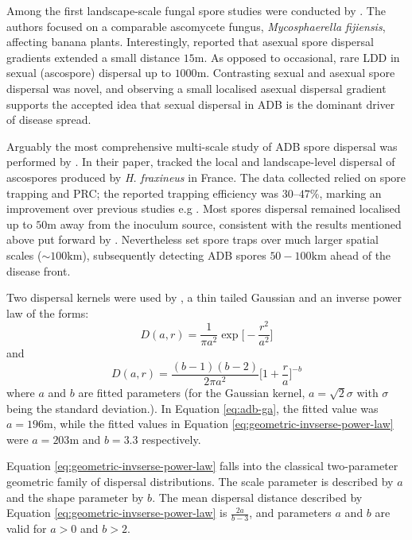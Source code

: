 Among the first landscape-scale fungal spore studies were conducted by \cite{long-range-dispersal}.
The authors focused on a comparable ascomycete fungus, \textit{Mycosphaerella fijiensis}, affecting banana plants.
Interestingly, \cite{long-range-dispersal} reported that asexual spore dispersal gradients extended 
a small distance $15\mathrm{m}$. As opposed to occasional, rare LDD in sexual (ascospore) dispersal up to $1000\mathrm{m}$.
Contrasting sexual and asexual spore dispersal was novel, and observing a small localised asexual dispersal gradient supports
the accepted idea that sexual dispersal in ADB is the dominant driver of disease spread.

Arguably the most comprehensive multi-scale study of ADB spore dispersal was performed by \cite{grosdidier2018tracking}.
In their paper, \cite{grosdidier2018tracking} tracked the local and landscape-level dispersal of ascospores
produced by \textit{H. fraxineus} in France.
The data collected relied on spore trapping and PRC; the reported trapping efficiency was $30–47\%$, marking an improvement over previous studies
e.g \cite{chandelier2014detection}. Most spores dispersal remained localised up to $50\mathrm{m}$ away from the inoculum source,
consistent with the results mentioned above put forward by \cite{chandelier2014detection}.
Nevertheless \cite{grosdidier2018tracking} set spore traps over much larger spatial scales ($\sim 100\mathrm{km}$),
subsequently detecting ADB spores $50-100\mathrm{km}$ ahead of the disease front.

Two dispersal kernels were used by \cite{grosdidier2018tracking}, a thin tailed Gaussian and an inverse 
power law of the forms:
\begin{equation}
    D(a, r) = \frac{1}{\pi a^2}\exp\big[-\frac{r^2}{a^2}\big]
    \label{eq:adb-ga}
\end{equation}
and
\begin{equation}
    D(a, r) = \frac{(b-1)(b-2)}{2\pi a^2}\big[ 1+ \frac{r}{a}\big]^{-b}
    \label{eq:geometric-invserse-power-law}
\end{equation}
where $a$ and $b$ are fitted parameters (for the Gaussian kernel, $a=\sqrt{2}\sigma$ with $\sigma$ being the standard deviation.).
In Equation \ref{eq:adb-ga}, the fitted value was $a=196\mathrm{m}$, while the fitted values in
Equation \ref{eq:geometric-invserse-power-law} were $a=203\mathrm{m}$ and $b=3.3$ respectively.

Equation \ref{eq:geometric-invserse-power-law} falls into the classical two-parameter geometric family of dispersal distributions.
The scale parameter is described by $a$ and the shape parameter by $b$. The mean dispersal distance described by Equation
\ref{eq:geometric-invserse-power-law} is $\frac{2a}{b-3}$, and parameters $a$ and $b$ are valid for $a>0$ and $b>2$.


